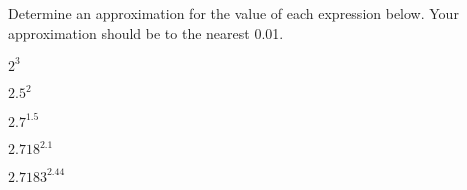 
\begin{problem}
\item Determine an approximation for the value of each expression
  below. Your approximation should be to the nearest 0.01.
  \begin{subproblem}
  \item $2^{3}$
    \vfill
  \item $2.5^{2}$
    \vfill
  \item $2.7^{1.5}$
    \vfill
  \item $2.718^{2.1}$
    \vfill
  \item $2.7183^{2.44}$
    \vfill
  \end{subproblem}
\end{problem}


